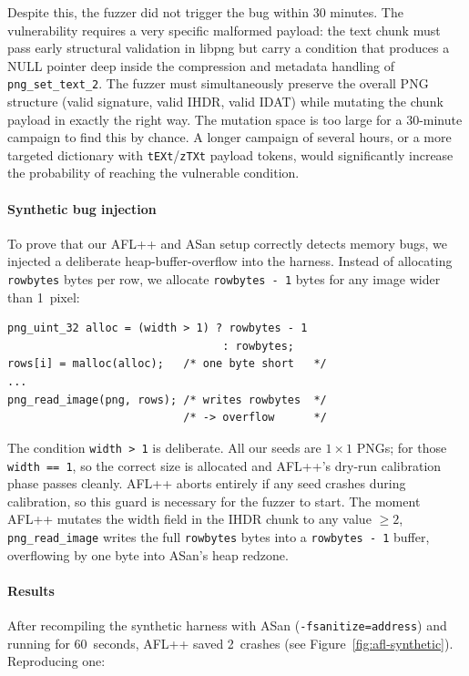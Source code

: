 Despite this, the fuzzer did not trigger the bug within 30 minutes.
The vulnerability requires a very specific malformed payload: the text
chunk must pass early structural validation in libpng but carry a
condition that produces a NULL pointer deep inside the compression and
metadata handling of \verb|png_set_text_2|. The fuzzer must
simultaneously preserve the overall PNG structure (valid signature,
valid IHDR, valid IDAT) while mutating the chunk payload in exactly
the right way. The mutation space is too large for a 30-minute campaign
to find this by chance. A longer campaign of several hours, or a more
targeted dictionary with \verb|tEXt|/\verb|zTXt| payload tokens, would
significantly increase the probability of reaching the vulnerable condition.
\vspace{-12pt}
\paragraph{Synthetic bug injection}
To prove that our AFL++ and ASan setup correctly detects memory bugs,
we injected a deliberate heap-buffer-overflow into the harness.
Instead of allocating \verb|rowbytes| bytes per row, we allocate
\verb|rowbytes - 1| bytes for any image wider than 1~pixel:

\begin{verbatim}
png_uint_32 alloc = (width > 1) ? rowbytes - 1
                                 : rowbytes;
rows[i] = malloc(alloc);   /* one byte short   */
...
png_read_image(png, rows); /* writes rowbytes  */
                           /* -> overflow      */
\end{verbatim}
\vspace{-7pt}
The condition \verb|width > 1| is deliberate. All our seeds are
$1{\times}1$ PNGs; for those \verb|width == 1|, so the correct size
is allocated and AFL++'s dry-run calibration phase passes cleanly.
AFL++ aborts entirely if any seed crashes during calibration, so this
guard is necessary for the fuzzer to start. The moment AFL++ mutates
the width field in the IHDR chunk to any value $\geq 2$,
\verb|png_read_image| writes the full \verb|rowbytes| bytes into a
\verb|rowbytes - 1| buffer, overflowing by one byte into ASan's heap
redzone.
\vspace{-12pt}
\paragraph{Results}
After recompiling the synthetic harness with ASan
(\verb|-fsanitize=address|) and running for 60~seconds, AFL++ saved
2~crashes (see Figure~\ref{fig:afl-synthetic}). Reproducing one:

